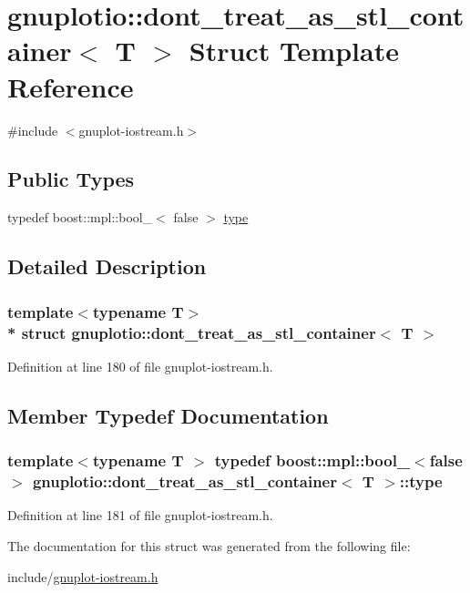 \hypertarget{structgnuplotio_1_1dont__treat__as__stl__container}{}\section{gnuplotio\+:\+:dont\+\_\+treat\+\_\+as\+\_\+stl\+\_\+container$<$ T $>$ Struct Template Reference}
\label{structgnuplotio_1_1dont__treat__as__stl__container}


{\ttfamily \#include $<$gnuplot-\/iostream.\+h$>$}

\subsection*{Public Types}
\begin{DoxyCompactItemize}
\item 
typedef boost\+::mpl\+::bool\+\_\+$<$ false $>$ \hyperlink{structgnuplotio_1_1dont__treat__as__stl__container_aa4404164a7547142376a9140ef07fd2a}{type}
\end{DoxyCompactItemize}


\subsection{Detailed Description}
\subsubsection*{template$<$typename T$>$\\*
struct gnuplotio\+::dont\+\_\+treat\+\_\+as\+\_\+stl\+\_\+container$<$ T $>$}



Definition at line 180 of file gnuplot-\/iostream.\+h.



\subsection{Member Typedef Documentation}
\subsubsection[{\texorpdfstring{type}{type}}]{\setlength{\rightskip}{0pt plus 5cm}template$<$typename T $>$ typedef boost\+::mpl\+::bool\+\_\+$<$false$>$ {\bf gnuplotio\+::dont\+\_\+treat\+\_\+as\+\_\+stl\+\_\+container}$<$ T $>$\+::{\bf type}}\hypertarget{structgnuplotio_1_1dont__treat__as__stl__container_aa4404164a7547142376a9140ef07fd2a}{}\label{structgnuplotio_1_1dont__treat__as__stl__container_aa4404164a7547142376a9140ef07fd2a}


Definition at line 181 of file gnuplot-\/iostream.\+h.



The documentation for this struct was generated from the following file\+:\begin{DoxyCompactItemize}
\item 
include/\hyperlink{gnuplot-iostream_8h}{gnuplot-\/iostream.\+h}\end{DoxyCompactItemize}

